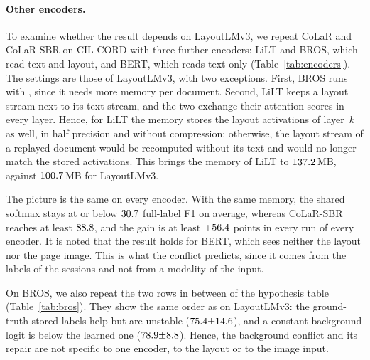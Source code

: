 \paragraph{Other encoders.} To examine whether the result depends on LayoutLMv3, we repeat
CoLaR and CoLaR-SBR on CIL-CORD with three further encoders: LiLT and BROS, which read text
and layout, and BERT, which reads text only (Table~\ref{tab:encoders}). The settings are
those of LayoutLMv3, with two exceptions. First, BROS runs with \nBrosRecipe, since it needs
more memory per document. Second, LiLT keeps a layout stream next to its text stream, and
the two exchange their attention scores in every layer. Hence, for LiLT the memory stores
the layout activations of layer~$k$ as well, in half precision and without compression;
otherwise, the layout stream of a replayed document would be recomputed without its text
and would no longer match the stored activations. This brings the memory of LiLT to
$137.2$\,MB, against $100.7$\,MB for LayoutLMv3.

The picture is the same on every encoder. With the same memory, the shared softmax stays at
or below $30.7$ full-label F1 on average, whereas CoLaR-SBR reaches at least
$88.8$, and the gain is at least $+56.4$ points in every run of every
encoder. It is noted that the result holds for BERT, which sees neither the layout nor the
page image. This is what the conflict predicts, since it comes from the labels of the
sessions and not from a modality of the input.

\begin{table}[!htbp]
  \centering
  \caption[Other encoders on CIL-CORD]{\textbf{Other encoders} on CIL-CORD: CoLaR with a
  shared softmax against CoLaR-SBR (full-label F1; mean $\pm$ s.d.). Batch: batch size of
  the runs. Memory: size of the memory of CoLaR-SBR. Smallest gain: the smallest gain of
  CoLaR-SBR over CoLaR among the paired runs.}
  \label{tab:encoders}
  \small
\end{table}

On BROS, we also repeat the two rows in between of the hypothesis table
(Table~\ref{tab:bros}). They show the same order as on LayoutLMv3: the ground-truth stored
labels help but are unstable ($75.4{\pm}14.6$), and a constant background logit is below
the learned one ($78.9{\pm}8.8$). Hence, the background conflict and its repair are not
specific to one encoder, to the layout or to the image input.

